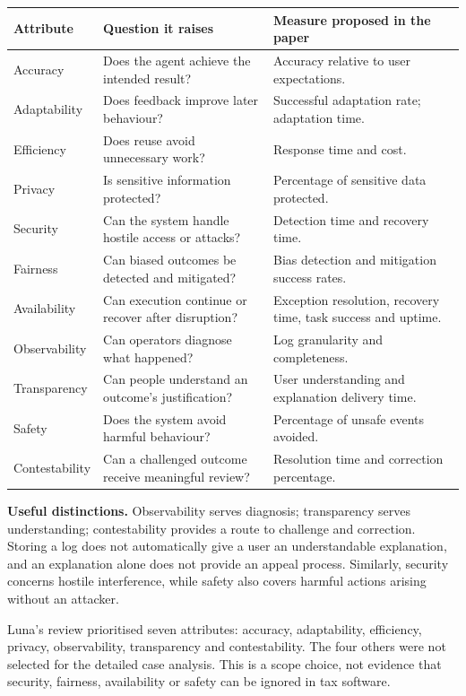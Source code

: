 \documentclass[11pt,a4paper]{article}
\begin{document}
{\small
\begin{tabularx}{\textwidth}{@{}p{}Y Y@{}}
\toprule
\textbf{Attribute} & \textbf{Question it raises} & \textbf{Measure proposed in the paper}\\
\midrule
Accuracy & Does the agent achieve the intended result? & Accuracy relative to user expectations.\\
Adaptability & Does feedback improve later behaviour? & Successful adaptation rate; adaptation time.\\
Efficiency & Does reuse avoid unnecessary work? & Response time and cost.\\
Privacy & Is sensitive information protected? & Percentage of sensitive data protected.\\
Security & Can the system handle hostile access or attacks? & Detection time and recovery time.\\
Fairness & Can biased outcomes be detected and mitigated? & Bias detection and mitigation success rates.\\
Availability & Can execution continue or recover after disruption? & Exception resolution, recovery time, task success and uptime.\\
Observability & Can operators diagnose what happened? & Log granularity and completeness.\\
Transparency & Can people understand an outcome's justification? & User understanding and explanation delivery time.\\
Safety & Does the system avoid harmful behaviour? & Percentage of unsafe events avoided.\\
Contestability & Can a challenged outcome receive meaningful review? & Resolution time and correction percentage.\\
\bottomrule
\end{tabularx}}

\textbf{Useful distinctions.} Observability serves diagnosis; transparency serves understanding; contestability provides a route to challenge and correction. Storing a log does not automatically give a user an understandable explanation, and an explanation alone does not provide an appeal process. Similarly, security concerns hostile interference, while safety also covers harmful actions arising without an attacker.

Luna's review prioritised seven attributes: accuracy, adaptability, efficiency, privacy, observability, transparency and contestability. The four others were not selected for the detailed case analysis. This is a scope choice, not evidence that security, fairness, availability or safety can be ignored in tax software.
\end{document}
